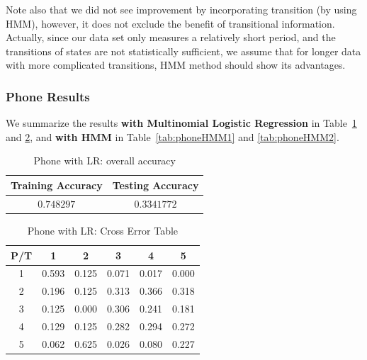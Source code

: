 Note also that we did not see improvement by incorporating transition (by using HMM), however, it does not exclude the benefit of transitional information. Actually, since our data set only measures a relatively short period, and the transitions of states are not statistically sufficient, we assume that for longer data with more complicated transitions, HMM method should show its advantages. 

\subsubsection{Phone Results} 
\label{subsec:phoneresult}

We summarize the results \textbf{with Multinomial Logistic Regression} in Table~\ref{tab:phoneLR1} and \ref{tab:phoneLR2}, and \textbf{with HMM} in Table~\ref{tab:phoneHMM1} and \ref{tab:phoneHMM2}.

\begin{table}[!htb]
\begin{center}
\begin{tabular}{c|c}
      \hline
      Training Accuracy & Testing Accuracy\\
      \hline
      $0.748297$ & $0.3341772$ \\
      \hline
\end{tabular}
\caption{Phone with LR: overall accuracy}
\label{tab:phoneLR1}
\end{center}
\end{table}

\begin{table}[!htb]
\begin{center}
\begin{tabular}{c|c|c|c|c|c}
      \hline
      P/T& 1 & 2 &3 & 4 & 5 \\
      \hline
      1 &0.593&0.125&0.071&0.017&0.000\\
      2 &0.196&0.125&0.313&0.366&0.318\\
      3 &0.125&0.000&0.306&0.241&0.181\\
      4 &0.129&0.125&0.282&0.294&0.272\\
      5 &0.062&0.625&0.026&0.080&0.227\\
      \hline
\end{tabular}
\caption{Phone with LR: Cross Error Table}
\label{tab:phoneLR2}
\end{center}
\end{table}

